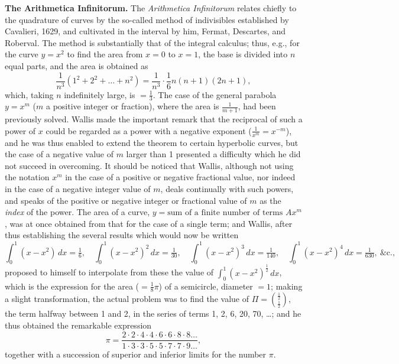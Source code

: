 \documentclass[11pt,a4paper]{article}
\begin{document}
\textbf{The Arithmetica Infinitorum.}\quad
The \textit{Arithmetica Infinitorum} relates chiefly to the quadrature of curves by the so-called method of indivisibles established by Cavalieri, 1629, and cultivated in the interval by him, Fermat, Descartes, and Roberval. The method is substantially that of the integral calculus; thus, e.g., for the curve $y = x^{2}$ to find the area from $x = 0$ to $x = 1$, the base is divided into $n$ equal parts, and the area is obtained as
\[
\frac{1}{n^{3}}(1^{2} + 2^{2} + \ldots + n^{2}) = \frac{1}{n^{3}} \cdot \frac{1}{6}n(n + 1)(2n + 1),
\]
which, taking $n$ indefinitely large, is $= \frac{1}{3}$. The case of the general parabola $y = x^{m}$ ($m$ a positive integer or fraction), where the area is $\frac{1}{m + 1}$, had been previously solved. Wallis made the important remark that the reciprocal of such a power of $x$ could be regarded as a power with a negative exponent ($\frac{1}{x^{m}} = x^{-m}$), and he was thus enabled to extend the theorem to certain hyperbolic curves, but the case of a negative value of $m$ larger than 1 presented a difficulty which he did not succeed in overcoming. It should be noticed that Wallis, although not using the notation $x^{m}$ in the case of a positive or negative fractional value, nor indeed in the case of a negative integer value of $m$, deals continually with such powers, and speaks of the positive or negative integer or fractional value of $m$ as the \textit{index} of the power. The area of a curve, $y = \text{sum of a finite number of terms } Ax^{m}$, was at once obtained from that for the case of a single term; and Wallis, after thus establishing the several results which would now be written
\[
\int_{0}^{1}(x - x^{2})\,dx = \tfrac{1}{6},\quad
\int_{0}^{1}(x - x^{2})^{2}\,dx = \tfrac{1}{30},\quad
\int_{0}^{1}(x - x^{2})^{3}\,dx = \tfrac{1}{140},\quad
\int_{0}^{1}(x - x^{2})^{4}\,dx = \tfrac{1}{630},\ \text{\&c.},
\]
proposed to himself to interpolate from these the value of $\int_{0}^{1}(x - x^{2})^{\frac{1}{2}}\,dx$, which is the expression for the area ($= \frac{1}{8}\pi$) of a semicircle, diameter $= 1$; making a slight transformation, the actual problem was to find the value of $\Pi = \binom{\frac{1}{2}}{\frac{1}{2}}$, the term halfway between 1 and 2, in the series of terms 1, 2, 6, 20, 70, \ldots; and he thus obtained the remarkable expression
\[
\pi = \frac{2 \cdot 2 \cdot 4 \cdot 4 \cdot 6 \cdot 6 \cdot 8 \cdot 8 \ldots}{1 \cdot 3 \cdot 3 \cdot 5 \cdot 5 \cdot 7 \cdot 7 \cdot 9 \ldots},
\]
together with a succession of superior and inferior limits for the number $\pi$.
\end{document}
